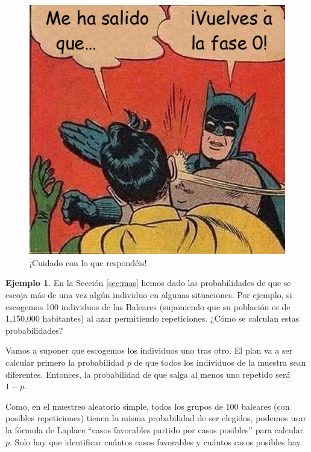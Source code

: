 \documentclass[
]{book}
\theoremstyle{definition}
\theoremstyle{definition}
\newtheorem{example}{Ejemplo}[chapter]
\theoremstyle{definition}
\theoremstyle{definition}
\theoremstyle{remark}
\begin{document}
\begin{figure}

{\centering \includegraphics[width=0.5\linewidth]{INREMDN_files/figure-html/batmanprobs} 

}

\caption{¡Cuidado con lo que respondéis!}\label{fig:unnamed-chunk-100}
\end{figure}

\begin{example}
\protect\hypertarget{exm:repes}{}\label{exm:repes}En la Sección \ref{sec:mas} hemos dado las probabilidades de que se escoja más de una vez algún individuo en algunas situaciones. Por ejemplo, si escogemos 100 individuos de las Baleares (suponiendo que su población es de 1,150,000 habitantes) al azar permitiendo repeticiones. ¿Cómo se calculan estas probabilidades?
\end{example}

Vamos a suponer que escogemos los individuos uno tras otro. El plan va a ser calcular primero la probabilidad \(p\) de que todos los individuos de la muestra sean diferentes. Entonces, la probabilidad de que salga al menos uno repetido será \(1-p\).

Como, en el muestreo aleatorio simple, todos los grupos de 100 baleares (con posibles repeticiones) tienen la misma probabilidad de ser elegidos, podemos usar la fórmula de Laplace ``casos favorables partido por casos posibles'' para calcular \(p\). Solo hay que identificar cuántos casos favorables y cuántos casos posibles hay.
\end{document}
